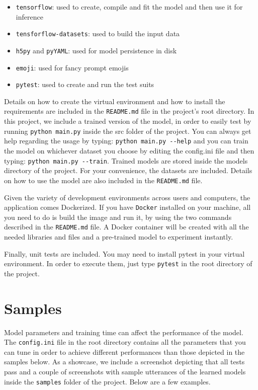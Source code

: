 \documentclass[10pt, twocolumn, a4paper]{article}
\begin{document}
\begin{itemize}
    \item \verb+tensorflow+: used to create, compile and fit the model and then use it for inference
    \item \verb+tensforflow-datasets+: used to build the input data
    \item \verb+h5py+ and \verb+pyYAML+: used for model persistence in disk
    \item \verb+emoji+: used for fancy prompt emojis
    \item \verb+pytest+: used to create and run the test suits
\end{itemize}

Details on how to create the virtual environment and how to install the requirements are included in the \verb+README.md+ file in the project’s root directory. In this project, we include a trained version of the model, in order to easily test by running \verb+python main.py+ inside the src folder of the project. You can always get help regarding the usage by typing: \verb+python main.py --help+ and you can train the model on whichever dataset you choose by editing the config.ini file and then typing: \verb+python main.py --train+. Trained models are stored inside the models directory of the project. For your convenience, the datasets are included. Details on how to use the model are also included in the \verb+README.md+ file.

Given the variety of development environments across users and computers, the application comes Dockerized. If you have \verb+Docker+ installed on your machine, all you need to do is build the image and run it, by using the two commands described in the \verb+README.md+ file. A Docker container will be created with all the needed libraries and files and a pre-trained model to experiment instantly.

Finally, unit tests are included. You may need to install pytest in your virtual environment. In order to execute them, just type \verb+pytest+ in the root directory of the project.

\section{Samples}
Model parameters and training time can affect the performance of the model. The \verb+config.ini+ file in the root directory contains all the parameters that you can tune in order to achieve different performances than those depicted in the samples below. As a showcase, we include a screenshot depicting that all tests pass and a couple of screenshots with sample utterances of the learned models inside the \verb+samples+ folder of the project. Below are a few examples.
\end{document}
